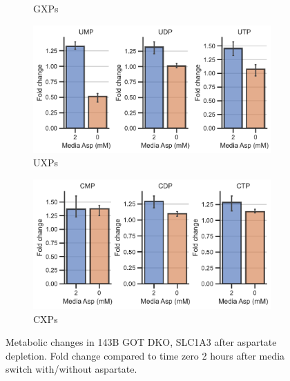 \begin{figure}[!ht]
\begin{subfigure}[b]{0.45\textwidth}
        \caption{GXPs}
        \label{fig:sapp:143B_GOT_gxp}
    \end{subfigure}
    \hfill
    \begin{subfigure}[b]{0.45\textwidth}
        \includegraphics[width=\textwidth]{figures/sapp/GOT_DKO_Asp_depl/143B_GOT_uxp.pdf}
        \caption{UXPs}
        \label{fig:sapp:143B_GOT_uxp}
    \end{subfigure}
    \hfill
    \begin{subfigure}[b]{0.45\textwidth}
        \includegraphics[width=\textwidth]{figures/sapp/GOT_DKO_Asp_depl/143B_GOT_cxp.pdf}
        \caption{CXPs}
        \label{fig:sapp:143B_GOT_cxp}
    \end{subfigure}
    \hfill
        \caption[Metabolic changes in 143B after Asp depl.]{
        Metabolic changes in 143B GOT DKO, SLC1A3 after aspartate depletion.
        Fold change compared to time zero 2 hours after media switch with/without aspartate.
        }
        \label{fig:sapp:GOT_DKO_Asp_depl:143B_DKO_metab}
\end{figure}





